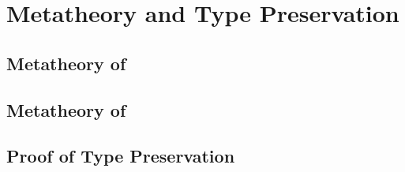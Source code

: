 \chapter{Metatheory and Type Preservation}

\section{Metatheory of \CICE}

\section{Metatheory of \lang}

\section{Proof of Type Preservation}
